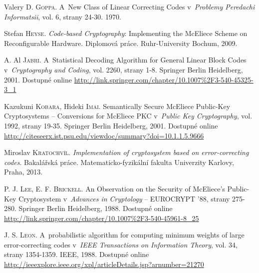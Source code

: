 \documentclass[thesis=M,czech,hidelinks]{FITthesis}[2012/06/26]
\newcommand{\0}{{\textcolor[gray]{0.75}{0}}}
\begin{document}
\begin{thebibliography}{99}
%

        Valery D. \textsc{Goppa}. A~New Class of Linear Correcting Codes
        v~\emph{Problemy Peredachi Informatsii}, vol. 6, strany 24-30. 1970.

        Stefan \textsc{Heyse}. \emph{Code-based Cryptography}: Implementing the
        McEliece Scheme on Reconfigurable Hardware. Diplomová práce.
        Ruhr-University Bochum, 2009.

        A. Al \textsc{Jabri}. A~Statistical Decoding Algorithm for General
        Linear Block Codes v~\emph{Cryptography and Coding}, vol. 2260, strany
        1-8. Springer Berlin Heidelberg, 2001. Dostupné online
        \url{http://link.springer.com/chapter/10.1007\%2F3-540-45325-3\_1}

        Kazukuni \textsc{Kobara}, Hideki \textsc{Imai}. Semantically Secure
        McEliece Public-Key Cryptosystems -- Conversions for McEliece PKC
        v~\emph{Public Key Cryptography}, vol. 1992, strany 19-35. Springer
        Berlin Heidelberg, 2001. Dostupné online
        \url{http://citeseerx.ist.psu.edu/viewdoc/summary?doi=10.1.1.5.9666}

        Miroslav \textsc{Kratochvíl}. \emph{Implementation of cryptosystem based
        on error-correcting codes}. Bakalářská práce. Matematicko-fyzikální
        fakulta Univerzity Karlovy, Praha, 2013.

        P. J. \textsc{Lee}, E. F. \textsc{Brickell}. An Observation on the
        Security of McEliece's Public-Key Cryptosystem v~\emph{Advances in
        Cryptology} -- EUROCRYPT '88, strany 275-280. Springer Berlin
        Heidelberg, 1988. Dostupné online
        \url{http://link.springer.com/chapter/10.1007\%2F3-540-45961-8\_25}

        J. S. \textsc{Leon}. A~probabilistic algorithm for computing minimum
        weights of large error-correcting codes v~\emph{IEEE Transactions on
        Information Theory}, vol. 34, strany 1354-1359. IEEE, 1988. Dostupné
        online
        \url{http://ieeexplore.ieee.org/xpl/articleDetails.jsp?arnumber=21270}


\end{thebibliography}
\end{document}
